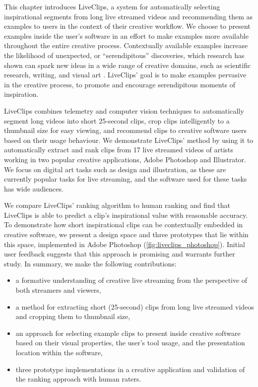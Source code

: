 This chapter introduces LiveClips, a system for automatically selecting inspirational segments from long live streamed videos and recommending them as examples to users in the context of their creative workflow. We choose to present examples inside the user's software in an effort to make examples more available throughout the entire creative process.
Contextually available examples increase the likelihood of unexpected, or ``serendipitous'' discoveries, which research has shown can spark new ideas in a wide range of creative domains, such as scientific research, writing, and visual art \cite{Bawden1986, Benjamin2014, Foster2003, Erdelez1999}. LiveClips' goal is to make examples pervasive in the creative process, to promote and encourage serendipitous moments of inspiration. 

LiveClips combines telemetry and computer vision techniques to automatically segment long videos into short 25-second clips, crop clips intelligently to a thumbnail size for easy viewing, and recommend clips to creative software users based on their usage behaviour. We demonstrate LiveClips' method by using it to automatically extract and rank clips from 17 live streamed videos of artists working in two popular creative applications, Adobe Photoshop and Illustrator. We focus on digital art tasks such as design and illustration, as these are currently popular tasks for live streaming, and the software used for these tasks has wide audiences.

We compare LiveClips' ranking algorithm to human ranking and find that LiveClips is able to predict a clip's inspirational value with reasonable accuracy. To demonstrate how short inspirational clips can be contextually embedded in creative software, we present a design space and three prototypes that lie within this space, implemented in Adobe Photoshop (\autoref{fig:liveclips_photoshop}). Initial user feedback suggests that this approach is promising and warrants further study. In summary, we make the following contributions:

\begin{itemize}
\item a formative understanding of creative live streaming from the perspective of both streamers and viewers,
\item a method for extracting short (25-second) clips from long live streamed videos and cropping them to thumbnail size,
\item an approach for selecting example clips to present inside creative software based on their visual properties, the user's tool usage, and the presentation location within the software,
\item three prototype implementations in a creative application and validation of the ranking approach with human raters. 
\end{itemize}
